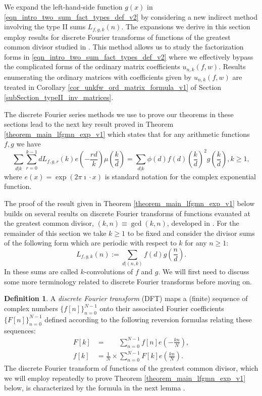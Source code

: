 \documentclass[12pt,reqno,a4letter]{article}
\numberwithin{figure}{section}
\numberwithin{table}{section}
\numberwithin{equation}{section}
\newcommand{\e}[1]{e\left(#1\right)}
\theoremstyle{plain}
\numberwithin{theorem}{section}
\theoremstyle{definition}
\newtheorem{definition}[theorem]{Definition}
\begin{document}
We expand the left-hand-side function 
$g(x)$ in \eqref{eqn_intro_two_sum_fact_types_def_v2} by considering a new 
indirect method involving the type II sums $L_{f,g,k}(n)$. The expansions we derive in this section 
employ results for discrete Fourier 
transforms of functions of the greatest common divisor studied in 
\cite{kamp-gcd-transform,SCHRAMM}. 
This method allows us to study the factorization forms in 
\eqref{eqn_intro_two_sum_fact_types_def_v2} where we effectively bypass the complicated forms of the 
ordinary matrix coefficients $u_{n,k}(f, w)$. Results enumerating the ordinary matrices with coefficients 
given by $u_{n,k}(f, w)$ are treated in 
Corollary \ref{cor_unkfw_ord_matrix_formula_v1} of 
Section \ref{subSection_typeII_inv_matrices}. 

The discrete Fourier series methods we use to prove our theorems in these sections 
lead to the next key result proved in Theorem \ref{theorem_main_lfgmn_exp_v1}
which states that for any arithmetic functions $f,g$ we have 
\[
\sum_{d|k} \sum_{r=0}^{k-1} d L_{f,g,r}(k) \e{-\frac{rd}{k}} \mu\left(\frac{k}{d}\right) = 
  \sum_{d|k} \phi(d) f(d) \left(\frac{k}{d}\right)^2 g\left(\frac{k}{d}\right), k \geq 1, 
\] 
where $\e{x} = \exp(2\pi\imath \cdot x)$ is standard notation for the 
complex exponential function. 

The proof of the result given in 
Theorem \ref{theorem_main_lfgmn_exp_v1} below builds on several results on 
discrete Fourier transforms of functions evauated at the greatest common divisor, 
$(k, n) \equiv \gcd(k, n)$, developed in \cite{kamp-gcd-transform}. 
For the remainder of this section we take $k \geq 1$ to be fixed and 
consider the divisor sums of the following form which are periodic with respect to 
$k$ for any $n \geq 1$: 
\[
L_{f,g,k}(n) := \sum_{d|(n,k)} f(d) g\left(\frac{n}{d}\right). 
\]
In \cite{kamp-gcd-transform} these sums are called $k$-convolutions of $f$ and $g$. 
We will first need to discuss some more terminology related to discrete Fourier 
transforms before moving on. 

\begin{definition}
\label{page_DTFT_coefficient_defs}
A \emph{discrete Fourier transform} (DFT) maps a (finite) sequence of complex numbers 
$\{f[n]\}_{n=0}^{N-1}$ onto their associated Fourier coefficients 
$\{F[n]\}_{n=0}^{N-1}$ defined according to the following reversion 
formulas relating these sequences: 
\begin{align*} 
F[k] & = \phantom{\frac{1}{N}\times} \sum_{n=0}^{N-1} f[n] e\left(-\frac{kn}{N}\right), \\ 
f[k] & = \frac{1}{N} \times \sum_{n=0}^{N-1} F[k] e\left(\frac{kn}{N}\right). 
\end{align*} 
The discrete Fourier transform of functions of the greatest common 
divisor, which we will employ 
repeatedly to prove Theorem \ref{theorem_main_lfgmn_exp_v1} below,  
is characterized by the formula in the next lemma 
\cite{kamp-gcd-transform,SCHRAMM}. 
\end{definition}
\end{document}
